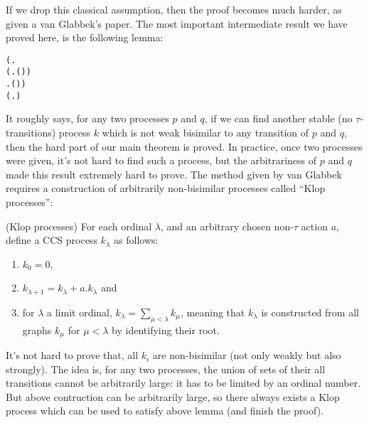 If we drop this classical assumption, then the proof becomes much
harder, as given a van Glabbek's paper. The most important
intermediate result we have proved here, is the following lemma:
\begin{alltt}
\HOLTokenTurnstile{} (\HOLSymConst{\HOLTokenExists{}}.
          \HOLSymConst{\HOLTokenConj{}} (\HOLSymConst{\HOLTokenForall{}} .  \HOLTokenWeakTransBegin{}\HOLTokenWeakTransEnd {} \HOLSymConst{\HOLTokenImp{}} \HOLSymConst{\HOLTokenNeg{}}( \HOLSymConst{\HOLTokenWeakEQ} )) \HOLSymConst{\HOLTokenConj{}}
        \HOLSymConst{\HOLTokenForall{}} .  \HOLTokenWeakTransBegin{}\HOLTokenWeakTransEnd {} \HOLSymConst{\HOLTokenImp{}} \HOLSymConst{\HOLTokenNeg{}}( \HOLSymConst{\HOLTokenWeakEQ} )) \HOLSymConst{\HOLTokenImp{}}
   (\HOLSymConst{\HOLTokenForall{}}.  \HOLSymConst{+}  \HOLSymConst{\HOLTokenWeakEQ}  \HOLSymConst{+} ) \HOLSymConst{\HOLTokenImp{}}
    \HOLSymConst{\HOLTokenObsCongr} 
\end{alltt}
It roughly says, for any two processes $p$ and $q$, if we can find
another stable (no $\tau$-transitions) process $k$ which is not weak bisimilar to any transition of
$p$ and $q$, then the hard part of our main theorem is proved. In
practice, once two processes were given, it's not hard to find
such a process, but the arbitrariness of $p$ and $q$ made this result
extremely hard to prove. The method given by van Glabbek requires a
construction of arbitrarily non-bisimilar processes called ``Klop
processes'':
\begin{definition}{(Klop processes)}
For each ordinal $\lambda$, and an arbitrary chosen non-$\tau$ action $a$,
define a CCS process $k_\lambda$ as follows:
\begin{enumerate}
\item $k_0 = 0$,
\item $k_{\lambda+1} = k_\lambda + a.k_\lambda$ and
\item for $\lambda$ a limit ordinal, $k_\lambda = \sum_{\mu < \lambda}
  k_\mu$, meaning that $k_\lambda$ is constructed from all graphs
  $k_\mu$ for $\mu < \lambda$ by identifying their root.
\end{enumerate}
\end{definition}
It's not hard to prove that, all $k_i$ are non-bisimilar (not only
weakly but also strongly). The idea is, for any two processes, the union of sets of their all
transitions cannot be arbitrarily large: it has to be limited by an
ordinal number. But above contruction can be arbitrarily large, so
there always exists a Klop process which can be used to satisfy above
lemma (and finish the proof).

